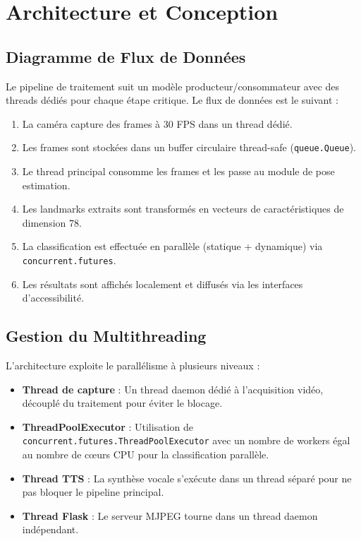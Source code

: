 \chapter{Architecture et Conception}

\section{Diagramme de Flux de Données}

Le pipeline de traitement suit un modèle producteur/consommateur avec des threads dédiés pour chaque étape critique. Le flux de données est le suivant :

\begin{enumerate}
    \item La caméra capture des frames à 30 FPS dans un thread dédié.
    \item Les frames sont stockées dans un buffer circulaire thread-safe (\texttt{queue.Queue}).
    \item Le thread principal consomme les frames et les passe au module de pose estimation.
    \item Les landmarks extraits sont transformés en vecteurs de caractéristiques de dimension 78.
    \item La classification est effectuée en parallèle (statique + dynamique) via \texttt{concurrent.futures}.
    \item Les résultats sont affichés localement et diffusés via les interfaces d'accessibilité.
\end{enumerate}

\section{Gestion du Multithreading}

L'architecture exploite le parallélisme à plusieurs niveaux :

\begin{itemize}
    \item \textbf{Thread de capture} : Un thread daemon dédié à l'acquisition vidéo, découplé du traitement pour éviter le blocage.
    \item \textbf{ThreadPoolExecutor} : Utilisation de \texttt{concurrent.futures.ThreadPoolExecutor} avec un nombre de workers égal au nombre de cœurs CPU pour la classification parallèle.
    \item \textbf{Thread TTS} : La synthèse vocale s'exécute dans un thread séparé pour ne pas bloquer le pipeline principal.
    \item \textbf{Thread Flask} : Le serveur MJPEG tourne dans un thread daemon indépendant.
\end{itemize}

